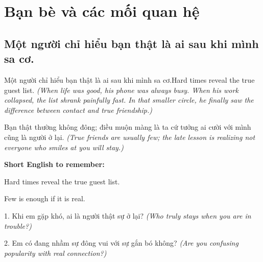 \chapter{Bạn bè và các mối quan hệ}

\section{Một người chỉ hiểu bạn thật là ai sau khi mình sa cơ.}
\begin{truyen}{Một người chỉ hiểu bạn thật là ai sau khi mình sa cơ.}{Hard times reveal the true guest list.}
\textit{(When life was good, his phone was always busy. When his work collapsed, the list shrank painfully fast. In that smaller circle, he finally saw the difference between contact and true friendship.)}
\end{truyen}
\begin{baihoc}
Bạn thật thường không đông; điều muộn màng là ta cứ tưởng ai cười với mình cũng là người ở lại.
\textit{(True friends are usually few; the late lesson is realizing not everyone who smiles at you will stay.)}
\end{baihoc}
\begin{ghinhoanh}
\textbf{Short English to remember:}

Hard times reveal the true guest list.

Few is enough if it is real.
\end{ghinhoanh}
\begin{tuhocnhanh}
1. Khi em gặp khó, ai là người thật sự ở lại? \textit{(Who truly stays when you are in trouble?)}

2. Em có đang nhầm sự đông vui với sự gắn bó không? \textit{(Are you confusing popularity with real connection?)}
\end{tuhocnhanh}
\ngancach

